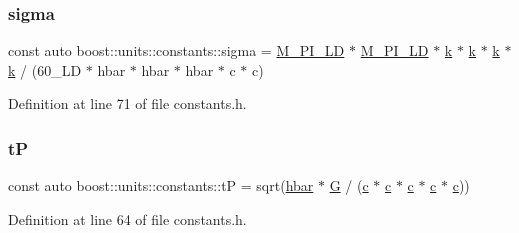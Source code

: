 \subsubsection{\texorpdfstring{sigma}{sigma}}
{\footnotesize\ttfamily const auto boost\+::units\+::constants\+::sigma = \hyperlink{namespaceboost_1_1units_1_1constants_a14415c6082722a7b15c191a15f513b40}{M\+\_\+\+P\+I\+\_\+\+LD} $\ast$ \hyperlink{namespaceboost_1_1units_1_1constants_a14415c6082722a7b15c191a15f513b40}{M\+\_\+\+P\+I\+\_\+\+LD} $\ast$ \hyperlink{namespaceboost_1_1units_1_1constants_aaa1646309f48431cdde13c0c78b18b44}{k} $\ast$ \hyperlink{namespaceboost_1_1units_1_1constants_aaa1646309f48431cdde13c0c78b18b44}{k} $\ast$ \hyperlink{namespaceboost_1_1units_1_1constants_aaa1646309f48431cdde13c0c78b18b44}{k} $\ast$ \hyperlink{namespaceboost_1_1units_1_1constants_aaa1646309f48431cdde13c0c78b18b44}{k} / (60\+\_\+\+L\+D $\ast$ hbar $\ast$ hbar $\ast$ hbar $\ast$ c $\ast$ c)}



Definition at line 71 of file constants.\+h.

\hypertarget{namespaceboost_1_1units_1_1constants_ae14ecc3dd777d3e2dca444164193ca80}{}\label{namespaceboost_1_1units_1_1constants_ae14ecc3dd777d3e2dca444164193ca80} 
\subsubsection{\texorpdfstring{tP}{tP}}
{\footnotesize\ttfamily const auto boost\+::units\+::constants\+::tP = sqrt(\hyperlink{namespaceboost_1_1units_1_1constants_a0203c96d139e639b8ee536cbc010c7bd}{hbar} $\ast$ \hyperlink{namespaceboost_1_1units_1_1constants_abeab95597a02e0f0bccbd005fd8cb968}{G} / (\hyperlink{namespaceboost_1_1units_1_1constants_a1e4c07de84b2d43e7717eaada50b32de}{c} $\ast$ \hyperlink{namespaceboost_1_1units_1_1constants_a1e4c07de84b2d43e7717eaada50b32de}{c} $\ast$ \hyperlink{namespaceboost_1_1units_1_1constants_a1e4c07de84b2d43e7717eaada50b32de}{c} $\ast$ \hyperlink{namespaceboost_1_1units_1_1constants_a1e4c07de84b2d43e7717eaada50b32de}{c} $\ast$ \hyperlink{namespaceboost_1_1units_1_1constants_a1e4c07de84b2d43e7717eaada50b32de}{c}))}



Definition at line 64 of file constants.\+h.

\hypertarget{namespaceboost_1_1units_1_1constants_a18461397bf032da161b03588a4ee3db9}{}\label{namespaceboost_1_1units_1_1constants_a18461397bf032da161b03588a4ee3db9} 
